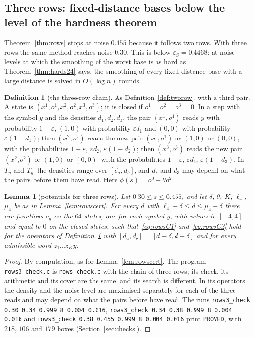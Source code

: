\documentclass[11pt]{amsart}
\newtheorem{lemma}[theorem]{Lemma}
\theoremstyle{definition}
\newtheorem{definition}[theorem]{Definition}
\theoremstyle{remark}
\newcommand{\eps}{\varepsilon}
\begin{document}
\subsection{Three rows: fixed-distance bases below the level of the hardness theorem}\label{sec:rows3}

Theorem~\ref{thm:rows} stops at noise $0.455$ because it follows two rows. With three rows the
same method reaches noise $0.30$. This is below $\eps_S=0.4468$: at noise levels at which the
smoothing of the worst base is as hard as Theorem~\ref{thm:hards24} says, the smoothing of every
fixed-distance base with a large distance is solved in $O(\log n)$ rounds.

\begin{definition}[the three-row chain]\label{def:threerow}
As Definition~\ref{def:tworow}, with a third pair. A state is $(x^1,o^1,x^2,o^2,x^3,o^3)$; it is
closed if $o^1=o^2=o^3=0$. In a step with the symbol $y$ and the densities $d_1,d_2,d_3$, the pair
$(x^1,o^1)$ reads $y$ with probability $1-\eps$, $(1,0)$ with probability $\eps d_1$ and $(0,0)$
with probability $\eps(1-d_1)$; then $(x^2,o^2)$ reads the new pair $(x^1,o^1)$ or $(1,0)$ or
$(0,0)$, with the probabilities $1-\eps$, $\eps d_2$, $\eps(1-d_2)$; then $(x^3,o^3)$ reads the
new pair $(x^2,o^2)$ or $(1,0)$ or $(0,0)$, with the probabilities $1-\eps$, $\eps d_3$,
$\eps(1-d_3)$. In $T_y$ and $T^-_y$ the densities range over $[d_a,d_b]$, and $d_2$ and $d_3$ may
depend on what the pairs before them have read. Here $\phi(s)=o^3-\theta o^2$.
\end{definition}

\begin{lemma}[potentials for three rows]\label{lem:rows3cert}
Let $0.30\le\eps\le0.455$, and let $\delta$, $\theta$, $K$, $\ell_4$, $\mu_4$ be as in
Lemma~\ref{lem:rowscert}. For every $d$ with $\ell_4-\delta\le d\le\mu_4+\delta$ there are
functions $c_y$ on the $64$ states, one for each symbol $y$, with values in $[-4,4]$ and equal to
$0$ on the closed states, such that~\eqref{eq:rowsC1} and~\eqref{eq:rowsC2} hold for the operators
of Definition~\ref{def:threerow} with $[d_a,d_b]=[d-\delta,d+\delta]$ and for every admissible
word $z_1\dots z_Ky$.
\end{lemma}

\begin{proof}
By computation, as for Lemma~\ref{lem:rowscert}. The program \texttt{rows3\_check.c} is
\texttt{rows\_check.c} with the chain of three rows; its check, its arithmetic and its cover are
the same, and its search is different. In its operators the density and the noise level are
maximised separately for each of the three reads and may depend on what the pairs before have
read. The runs
\texttt{rows3\_check 0.30 0.34 0.999 8 0.004 0.016},
\texttt{rows3\_check 0.34 0.38 0.999 8 0.004 0.016} and
\texttt{rows3\_check 0.38 0.455 0.999 8 0.004 0.016} print \texttt{PROVED}, with $218$, $106$ and
$179$ boxes (Section~\ref{sec:checks}).
\end{proof}
\end{document}
